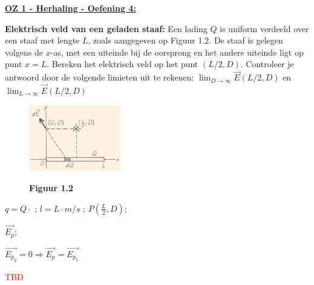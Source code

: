 \textbf{\underline{OZ 1 - Herhaling - Oefening 4:}}
\vspace{0.5cm}

\textbf{Elektrisch veld van een geladen staaf:} Een lading $ Q $ is uniform verdeeld over een staaf met lengte $ L $, zoals aangegeven op Figuur 1.2. De staaf is gelegen volgens de $ x $-as, met een uiteinde bij de oorsprong en het andere uiteinde ligt op punt $ x = L $. Bereken het elektrisch veld op het punt $ \left( L/2, D \right) $. Controleer je antwoord door de volgende limieten uit te rekenen: $ \lim_{ D \to \infty } \Vec{E} \left( L/2, D \right) $ en $ \lim_{ L \to \infty } \Vec{E} \left( L/2, D \right) $

\begin{figure}[h]
    \centering
    \includegraphics[width=4cm]{oz01/herhaling/resources/oef-4-opgave.png}
    
    \textbf{Figuur 1.2}
\end{figure}

\begin{description}[labelwidth=1.5cm, leftmargin=!]
    \item[Geg. :]   $ q = Q \cdot $ ; $ l = L \cdot m/s $ ; $ P(\frac{L}{2},D) $;
    \item[Gevr. :]  $ \vec{E_p}$;
    \item[Opl. :]   $ \vec{E_{p_y}} = 0  \Rightarrow \vec{E_p} = \vec{E_{p_x}} $
    
                    \textcolor{red}{TBD}
                    
\end{description}

\vspace{1cm}